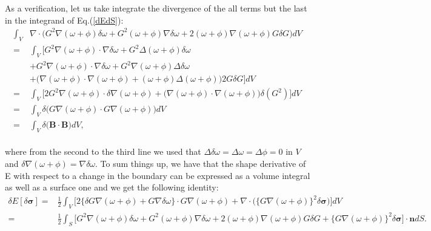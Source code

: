 \documentclass[aps,prc,floatfix,showkeys,nofootinbib]{revtex4-1}
\newcommand{\beq}{\begin{equation}}
\newcommand{\eeq}{\end{equation}}
\newcommand{\BB}{\textbf{B}}
\newcommand{\Div}{\nabla\cdot}
\newcommand{\grad}{\nabla}
\begin{document}
\noindent As a verification, let us take integrate the divergence of the all terms but the last in the integrand of Eq.(\ref{dEdS}):\\

\beq
\begin{split}
\int_V&\Div \Big( G^2 \grad(\omega+\phi) \delta \omega + G^2(\omega + \phi)\grad \delta \omega + 2(\omega + \phi)\grad (\omega + \phi)G \delta G\Big) dV\\
=&\int_V \Bigg[ G^2\grad(\omega+\phi) \cdot \grad\delta \omega + G^2\Delta(\omega+\phi) \delta \omega\\
 &+ G^2\grad(\omega + \phi)\cdot \grad \delta \omega +G^2\grad(\omega + \phi) \Delta \delta \omega\\
 &+ \Big(\grad(\omega + \phi)\cdot\grad (\omega + \phi) +(\omega + \phi)\Delta (\omega + \phi) \Big) 2G \delta G\Bigg]dV\\
 =&\int_V \Bigg[ 2G^2 \grad(\omega + \phi) \cdot \delta \grad(\omega+\phi) + \big( \grad(\omega + \phi) \cdot \grad(\omega + \phi)\big)\delta(G^2)\Bigg] dV\\
 =& \int_V \delta \Big( G \grad(\omega+\phi)\cdot G \grad(\omega + \phi) \Big) dV\\
 =& \int_V \delta \Big(\BB \cdot \BB \Big)dV,
\end{split}
\eeq\\

\noindent where from the second to the third line we used that $\Delta \delta \omega = \Delta \omega = \Delta \phi = 0$ in $V$ and $\delta \grad(\omega + \phi) = \grad \delta \omega$. To sum things up, we have that the shape derivative of E with respect to a change in the boundary can be expressed as a volume integral as well as a surface one and we get the following identity:\\

\beq
\begin{split}
\delta E [\delta \bm{\sigma}] =& \frac{1}{2}\int_V \Bigg[ 2 \Big\{\delta G\nabla(\omega + \phi) + G\nabla\delta \omega \Big\}\cdot G \nabla(\omega + \phi) + \Div \Big(\{G\grad (\omega + \phi)\}^2 \delta \bm{\sigma}\Big)\Bigg] dV\\
=& \frac{1}{2}\int_S \Bigg[G^2 \grad(\omega+\phi) \delta \omega + G^2(\omega + \phi)\grad \delta \omega + 2(\omega + \phi)\grad (\omega + \phi)G \delta G + \{G\grad (\omega + \phi)\}^2 \delta \bm{\sigma}\Bigg]\cdot \mathbf{n}dS.
\end{split}\label{dE_Final}
\eeq\\
\end{document}
